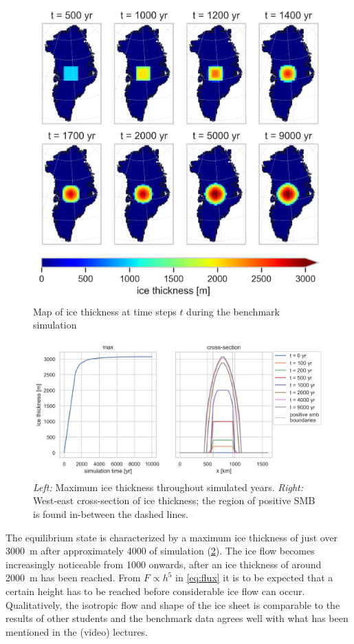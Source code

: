 \begin{figure}
	\centering
	\includegraphics[width=0.7\linewidth]{../benchmark/figs/ice-map.png}
	\caption{Map of ice thickness at time steps \(t\) during the benchmark simulation}
	\label{fig:benchmark-map}
\end{figure}

\begin{figure}
	\centering
	\includegraphics[width=\linewidth]{../benchmark/figs/cross-section.png}
	\caption{\textit{Left:} Maximum ice thickness throughout simulated years. \textit{Right:} West-east cross-section of ice thickness; the region of positive SMB is found in-between the dashed lines.}
	\label{fig:benchmark-cross-section}
\end{figure}

The equilibrium state is characterized by a maximum ice thickness of just over \SI{3000}{\m} after approximately \SI{4000}{\year} of simulation  (\cref{fig:benchmark-cross-section}). The ice flow becomes increasingly noticeable from \SI{1000}{\year} onwards, after an ice thickness of around \SI{2000}{\m} has been reached. From \(F \propto h^5\) in \cref{eq:flux} it is to be expected that a certain height has to be reached before considerable ice flow can occur. Qualitatively, the isotropic flow and shape of the ice sheet is comparable to the results of other students and the benchmark data agrees well with what has been mentioned in the (video) lectures.

